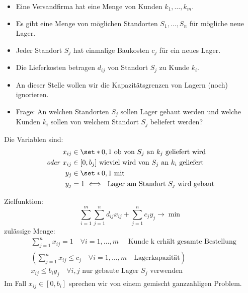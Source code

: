 \begin{beispiel}\enter
  \begin{itemize}[nosep]
    \item Eine Versandfirma hat eine Menge von Kunden $k_{1},\dots,k_{m}$.
	  \item Es gibt eine Menge von möglichen Standorten $S_{1},\dots, S_{n}$ für mögliche neue Lager.
    \item Jeder Standort $S_j$ hat einmalige Baukosten $c_{j}$ für ein neues Lager.
    \item Die Lieferkosten betragen $d_{ij}$ von Standort $S_{j}$ zu Kunde $k_{i}$.
    \item An dieser Stelle wollen wir die Kapazitätsgrenzen von Lagern (noch) ignorieren.
	  \item Frage: An welchen Standorten $S_{j}$ sollen Lager gebaut werden und welche Kunden $k_{i}$ sollen von welchem Standort $S_{j}$ beliefert werden?
  \end{itemize}
	Die Variablen sind:
	\begin{align*}
    x_{ij}&\in \set*{0,1} \text{ ob von $S_j$ an $k_j$ geliefert wird}\\
    \text{\emph{oder} } x_{ij} & \in [0,b_j] \text{ wieviel wird von $S_{j}$ an $k_{i}$ geliefert}\\
		y_{j} &\in \set*{0,1}\text{ mit }  \\
		y_{j}& = 1 \iff \text{ Lager am Standort $S_{j}$ wird gebaut}
	\end{align*}

	Zielfunktion:
	\begin{equation*}
		\sum_{i=1}^{m} \sum_{j=1}^{n}  d_{ij}x_{ij} + \sum_{j=1}^{n} c_{j}y_{j} \rightarrow \min
	\end{equation*}
	zulässige Menge:
	\begin{align*}
		&\sum_{j=1}^{n} x_{ij} =1 \quad \forall i=1,\dots, m\quad \text{ Kunde k erhält gesamte Bestellung}\\
		&\left(\sum_{j=1}^{n} x_{ij} \leq c_{j} \quad \forall i=1,\dots, m \quad \text{Lagerkapazität}\right)\\
		&x_{ij} \leq b_{i}y_{j} \quad \forall i,j \text{ nur gebaute Lager $S_{j}$ verwenden}
	\end{align*}
	Im Fall $x_{ij} \in [0,b_{i}]$ sprechen wir von einem gemischt ganzzahligen Problem.
\end{beispiel}

